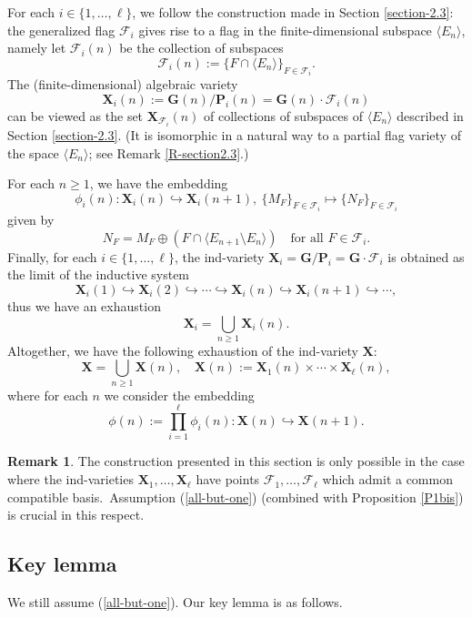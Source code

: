 \documentclass[12pt]{amsart}
\newcommand{\G}{\mathbf{G}}
\renewcommand{\P}{\mathbf{P}}
\newcommand{\X}{\mathbf{X}}
\newcommand{\Ff}{\mathcal{F}}
\renewcommand{\span}[1]{\langle #1\rangle}
\numberwithin{equation}{section}
\theoremstyle{definition}
\newtheorem{remark}[theorem]{Remark}
\begin{document}
For each $i\in\{1,\ldots,\ell\}$, 
we follow the construction made in Section \ref{section-2.3}:
the generalized flag $\Ff_i$ gives rise to a flag in the finite-dimensional subspace $\langle E_n\rangle$, namely
let $\Ff_i(n)$ be the collection of subspaces
\[\Ff_i(n):=\{F\cap \span{E_n}\}_{F\in\Ff_i}.\]
The (finite-dimensional) algebraic variety 
\[
\X_i(n):=\G(n)/\P_i(n)=\G(n)\cdot\Ff_i(n)
\]
can be viewed as the set $\X_{\Ff_i}(n)$ of collections of subspaces of $\span{E_n}$ described in
Section \ref{section-2.3}.
(It is isomorphic in a natural way to a partial flag variety of the space $\span{E_n}$; see Remark \ref{R-section2.3}.)

For each $n\geq 1$, we have the embedding
\[
\phi_i(n):\X_i(n)\hookrightarrow\X_i(n+1),\ \{M_F\}_{F\in \Ff_i}\mapsto\{N_F\}_{F\in\Ff_i}
\]
given by
\[
N_F=M_F\oplus(F\cap \span{E_{n+1}\setminus E_n})\quad\mbox{for all $F\in\Ff_i$.}
\]
Finally, for each $i\in\{1,\ldots,\ell\}$, the ind-variety $\X_i=\G/\P_i=\G\cdot\Ff_i$ is obtained as the limit of the inductive system
\[
\X_i(1)\hookrightarrow\X_i(2)\hookrightarrow\cdots\hookrightarrow\X_i(n)\hookrightarrow\X_i(n+1)\hookrightarrow\cdots,
\]
thus we have an exhaustion
\[\X_i=\bigcup_{n\geq 1}\X_i(n).\] 
Altogether, we have the following exhaustion of the ind-variety $\X$:
\[\X=\bigcup_{n\geq 1}\X(n),\quad\X(n):=\X_1(n)\times\cdots\times\X_\ell(n),\]
where for each $n$ we consider the embedding
\begin{equation}
\label{phi(n)}
\phi(n):=\prod_{i=1}^\ell\phi_i(n):\X(n)\hookrightarrow\X(n+1).
\end{equation}

\begin{remark} 
The construction presented in this section is only possible in the case where the ind-varieties $\X_1,\ldots,\X_\ell$ have points $\Ff_1,\ldots,\Ff_\ell$ which admit a common compatible basis.\ Assumption (\ref{all-but-one}) (combined with Proposition \ref{P1bis}) is crucial in this respect.
\end{remark}

\subsection{Key lemma} 
\label{subsection-keylemma}

We still assume (\ref{all-but-one}).
Our key lemma is as follows.
\end{document}
